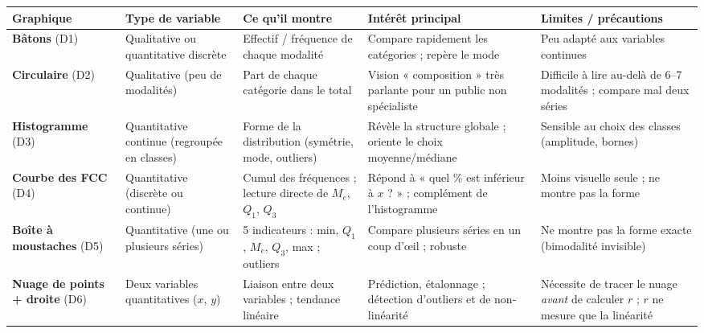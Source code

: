 \documentclass[11pt,a4paper]{article}
\begin{document}
\vspace{0.3cm}

\begin{tcolorbox}[enhanced, colback=biolight, colframe=biocolor,
                  title={\faChartBar\ \ \textbf{Choisir le bon graphique}},
                  coltitle=white, fonttitle=\bfseries\large,
                  boxrule=0.8pt, arc=4pt, left=8pt, right=8pt, top=8pt, bottom=8pt,
                  drop fuzzy shadow=black!15]
\small
\renewcommand{\arraystretch}{1.35}
\begin{tabular}{|p{2.4cm}|p{2.6cm}|p{2.6cm}|p{3.4cm}|p{3.2cm}|}
\hline
\rowcolor{biocolor!20}
\textbf{Graphique} & \textbf{Type de variable} & \textbf{Ce qu'il montre} & \textbf{Intérêt principal} & \textbf{Limites / précautions} \\
\hline
\textbf{Bâtons} (D1) & Qualitative ou quantitative discrète & Effectif / fréquence de chaque modalité & Compare rapidement les catégories ; repère le mode & Peu adapté aux variables continues \\
\hline
\textbf{Circulaire} (D2) & Qualitative (peu de modalités) & Part de chaque catégorie dans le total & Vision « composition » très parlante pour un public non spécialiste & Difficile à lire au-delà de 6--7 modalités ; compare mal deux séries \\
\hline
\textbf{Histogramme} (D3) & Quantitative continue (regroupée en classes) & Forme de la distribution (symétrie, mode, outliers) & Révèle la structure globale ; oriente le choix moyenne/médiane & Sensible au choix des classes (amplitude, bornes) \\
\hline
\textbf{Courbe des FCC} (D4) & Quantitative (discrète ou continue) & Cumul des fréquences ; lecture directe de $M_e$, $Q_1$, $Q_3$ & Répond à « quel \% est inférieur à $x$ ? » ; complément de l'histogramme & Moins visuelle seule ; ne montre pas la forme \\
\hline
\textbf{Boîte à moustaches} (D5) & Quantitative (une ou plusieurs séries) & 5 indicateurs : min, $Q_1$, $M_e$, $Q_3$, max ; outliers & Compare plusieurs séries en un coup d'œil ; robuste & Ne montre pas la forme exacte (bimodalité invisible) \\
\hline
\textbf{Nuage de points + droite} (D6) & Deux variables quantitatives ($x$, $y$) & Liaison entre deux variables ; tendance linéaire & Prédiction, étalonnage ; détection d'outliers et de non-linéarité & Nécessite de tracer le nuage \emph{avant} de calculer $r$ ; $r$ ne mesure que la linéarité \\
\hline
\end{tabular}
\end{tcolorbox}
\end{document}
